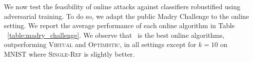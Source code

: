 We now test the feasibility of online attacks against classifiers robustified using adversarial training. To do so, we adapt the public Madry Challenge \citep{madry2017towards} to the online setting. We report the average performance of each online algorithm in Table ~\ref{table:madry_challenge}. We observe that \algoname\ is the best online algorithms, outperforming \textsc{Virtual} and \textsc{Optimistic}, in all settings except for $k=10$ on MNIST where \textsc{Single-Ref} is slightly better. 

